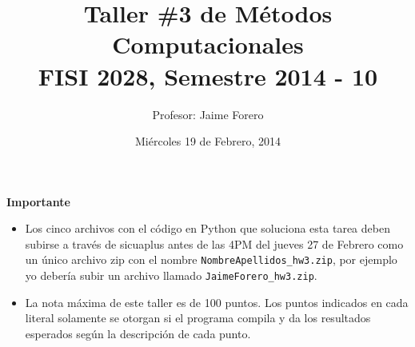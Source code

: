 \documentclass{article}
\title{Taller \#3 de M\'etodos Computacionales\\ FISI 2028, Semestre 2014 - 10}
\author{Profesor: Jaime Forero}
\date{Mi\'ercoles 19 de Febrero, 2014}
\begin{document}
\maketitle
\thispagestyle{empty}


{\bf Importante}
\begin{itemize}

\item Los cinco archivos con el c\'odigo en Python que soluciona esta
  tarea deben subirse a trav\'es de sicuaplus antes de las 4PM del
  jueves 27 de Febrero como un \'unico archivo zip con el nombre
  \verb"NombreApellidos_hw3.zip", por ejemplo yo deber\'ia subir un
  archivo llamado \verb"JaimeForero_hw3.zip". 

\item La nota m\'axima de este taller es de 100 puntos. Los puntos indicados
  en cada literal solamente se otorgan si el programa compila y da los
  resultados esperados seg\'un la descripci\'on de cada punto.
 
\end{itemize}
\end{document}
